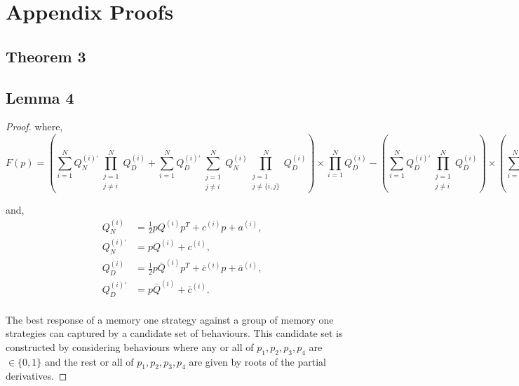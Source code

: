 \section{Appendix Proofs}

\subsection{Theorem 3}




\subsection{Lemma 4}

\begin{proof}

    where,
    \begin{equation}\label{eq:group_derivative_numerator_condition}
    F(p)=(\sum\limits_{i=1} ^ {N} Q_{N}^{(i)'} \prod_{\substack{j=1 \\ j \neq i}} ^ N Q_{D}^{(i)}
     + \sum\limits_{i=1} ^ {N} Q_{D}^{(i)'} \sum_{\substack{j=1 \\ j \neq i}} ^ {N} Q_{N}^{(i)}
    \prod_{\substack{j=1 \\ j \neq \{i, j\}}} ^ N Q_{D}^{(i)}) \times
    \prod\limits_{i=1} ^ N Q_{D}^{(i)} - (\sum\limits_{i=1} ^ {N} Q_{D}^{(i)'}
    \prod_{\substack{j=1 \\ j \neq i}} ^ N Q_{D}^{(i)}) \times
    (\sum\limits_{i=1} ^ {N} Q_{N}^{(i)} \prod_{\substack{j=1 \\ j \neq i}} ^ N Q_{D}^{(i)})
    \end{equation}

    and,
    \begin{align*}
        Q_{N}^{(i) } & = \frac{1}{2} pQ^{(i)} p^T + c^{(i)} p + a^ {(i)}, \\
        Q_{N}^{(i)'} & =  pQ^{(i)} + c^{(i)}, \\
        Q_{D}^{(i) } & = \frac{1}{2} p\bar{Q}^{(i)} p^T + \bar{c}^{(i)} p + \bar{a}^ {(i)}, \\
        Q_{D}^{(i)'} & =  p\bar{Q}^{(i)} + \bar{c}^{(i)}. \\
    \end{align*}


    The best response of a memory one strategy against a group of memory one
    strategies can captured by a candidate set of behaviours. This candidate set
    is constructed by considering behaviours where any or all of \(p_1, p_2,
    p_3, p_4\) are \(\in \{0, 1\}\) and the rest or all of \(p_1, p_2, p_3,
    p_4\) are given by roots of the partial derivatives.
    

\end{proof}
